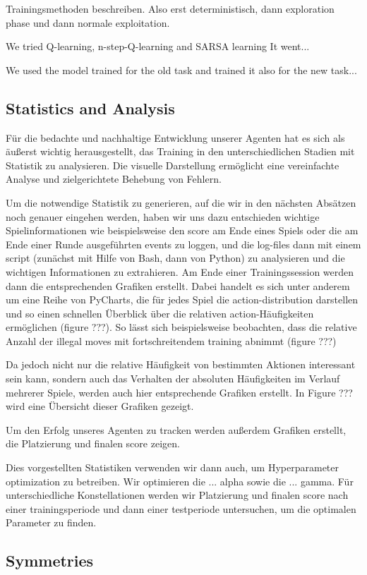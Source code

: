 Trainingsmethoden beschreiben. Also erst deterministisch, dann exploration phase und dann normale exploitation.

We tried Q-learning, n-step-Q-learning and SARSA learning It went...

We used the model trained for the old task and trained it also for the new task...

\subsection{Statistics and Analysis}
Für die bedachte und nachhaltige Entwicklung unserer Agenten hat es sich als äußerst wichtig herausgestellt, das Training in den unterschiedlichen Stadien mit Statistik zu analysieren. Die visuelle Darstellung ermöglicht eine vereinfachte Analyse und zielgerichtete Behebung von Fehlern.

Um die notwendige Statistik zu generieren, auf die wir in den nächsten Absätzen noch genauer eingehen werden, haben wir uns dazu entschieden wichtige Spielinformationen wie beispielsweise den score am Ende eines Spiels oder die am Ende einer Runde ausgeführten events zu loggen, und die log-files dann mit einem script (zunächst mit Hilfe von Bash, dann von Python) zu analysieren und die wichtigen Informationen zu extrahieren. Am Ende einer Trainingssession werden dann die entsprechenden Grafiken erstellt. Dabei handelt es sich unter anderem um eine Reihe von PyCharts, die für jedes Spiel die action-distribution darstellen und so einen schnellen Überblick über die relativen action-Häufigkeiten ermöglichen (figure ???). So lässt sich beispielsweise beobachten, dass die relative Anzahl der illegal moves mit fortschreitendem training abnimmt (figure ???)

Da jedoch nicht nur die relative Häufigkeit von bestimmten Aktionen interessant sein kann, sondern auch das Verhalten der absoluten Häufigkeiten im Verlauf mehrerer Spiele, werden auch hier entsprechende Grafiken erstellt. In Figure ??? wird eine Übersicht dieser Grafiken gezeigt.

Um den Erfolg unseres Agenten zu tracken werden außerdem Grafiken erstellt, die Platzierung und finalen score zeigen.


Dies vorgestellten Statistiken verwenden wir dann auch, um Hyperparameter optimization zu betreiben. Wir optimieren die ... alpha sowie die ... gamma. Für unterschiedliche Konstellationen werden wir Platzierung und finalen score nach einer trainingsperiode und dann einer testperiode untersuchen, um die optimalen Parameter zu finden.


\subsection{Symmetries}\label{symmetries}